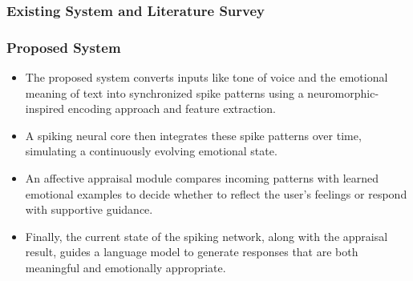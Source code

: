 \documentclass[aspectratio=169]{beamer}
\begin{document}
\begin{frame}
    \frametitle{Existing System and Literature Survey}
    \renewcommand{\arraystretch}{1.5}
    \setlength{\tabcolsep}{8pt}
    \begin{table}[]
        \centering
        \caption{Literature Survey}
    \end{table}
\end{frame}
            
            





\begin{frame}
    \frametitle{Proposed System}  
    \begin{itemize}
        \item The proposed system converts inputs  like tone of voice and the emotional meaning of text into synchronized spike patterns using a neuromorphic-inspired encoding approach and feature extraction.
        \item A spiking neural core then integrates these spike patterns over time, simulating a continuously evolving emotional state.
        \item An affective appraisal module compares incoming patterns with learned emotional examples to decide whether to reflect the user's feelings or respond with supportive guidance.
        \item Finally, the current state of the spiking network, along with the appraisal result, guides a language model to generate responses that are both meaningful and emotionally appropriate.
    \end{itemize}
\end{frame}
\end{document}
